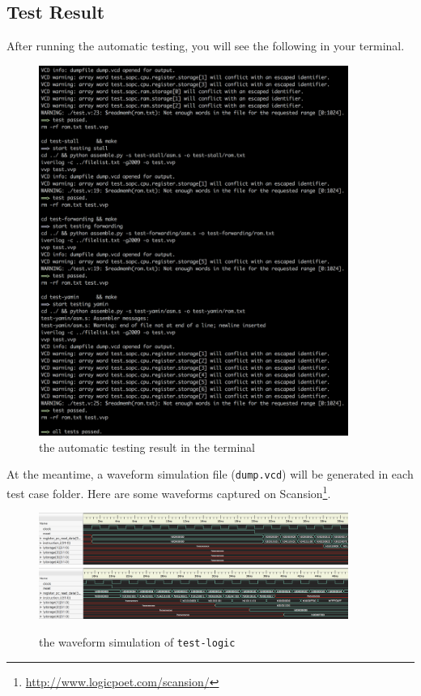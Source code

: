 \documentclass{article}
\begin{document}
\subsection{Test Result}
After running the automatic testing, you will see the following in your terminal.
\begin{figure}[!h]
\begin{center}
\includegraphics[width=0.9\textwidth]{image/terminal}
\caption{the automatic testing result in the terminal}
\end{center}
\end{figure}

At the meantime, a waveform simulation file (\texttt{dump.vcd}) will be generated in each test case folder. Here are some waveforms captured on Scansion\footnote{\url{http://www.logicpoet.com/scansion/}}.
\begin{figure}[!h]
\begin{center}
\includegraphics[width=0.9\textwidth]{image/test-logic-1}
\includegraphics[width=0.9\textwidth]{image/test-logic-2}
\caption{the waveform simulation of \texttt{test-logic}}
\end{center}
\end{figure}
\end{document}

